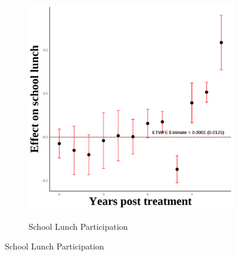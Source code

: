 \documentclass[12pt,english]{article}
\begin{document}
\begin{figure}[H]
\begin{subfigure}[b]{0.3\textwidth}
    \label{fig:ln-schl-lunch-third-three}
  \end{subfigure}
  \hfill
  \begin{subfigure}[b]{0.3\textwidth}
    \centering
    \caption{School Lunch Participation}
    \includegraphics[width=\linewidth]{figures/plot75-schl_lunch_event_study-third-three.png}
    \label{fig:schl-lunch-third-three}
  \end{subfigure}

  \vspace{0.3cm} %


\end{figure}
\end{document}
